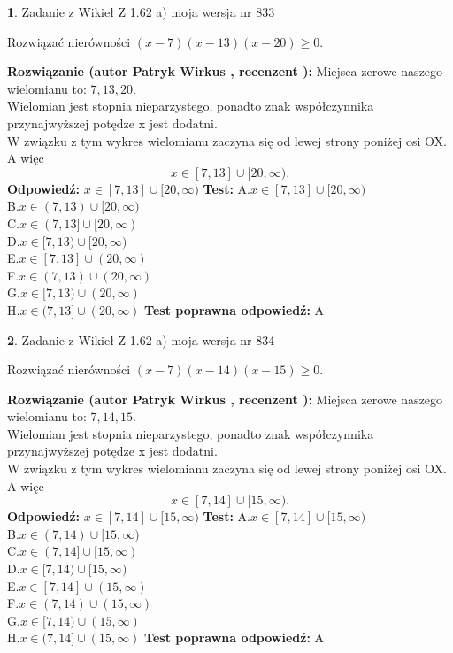 \documentclass[12pt, a4paper]{article}
\theoremstyle{definition} %
\newtheorem{zad}{}
\newcommand{\zadStart}[1]{\begin{zad}#1\newline}
\newcommand{\zadStop}{\end{zad}}
\newcommand{\rozwStart}[2]{\noindent \textbf{Rozwiązanie (autor #1 , recenzent #2): }\newline}
\newcommand{\rozwStop}{\newline}
\newcommand{\odpStart}{\noindent \textbf{Odpowiedź:}\newline}
\newcommand{\odpStop}{\newline}
\newcommand{\testStart}{\noindent \textbf{Test:}\newline}
\newcommand{\testStop}{\newline}
\newcommand{\kluczStart}{\noindent \textbf{Test poprawna odpowiedź:}\newline}
\newcommand{\kluczStop}{\newline}
\begin{document}
\zadStart{Zadanie z Wikieł Z 1.62 a) moja wersja nr 833}

Rozwiązać nierówności $(x-7)(x-13)(x-20)\ge0$.
\zadStop
\rozwStart{Patryk Wirkus}{}
Miejsca zerowe naszego wielomianu to: $7, 13, 20$.\\
Wielomian jest stopnia nieparzystego, ponadto znak współczynnika przy\linebreak najwyższej potędze x jest dodatni.\\ W związku z tym wykres wielomianu zaczyna się od lewej strony poniżej osi OX. A więc $$x \in [7,13] \cup [20,\infty).$$
\rozwStop
\odpStart
$x \in [7,13] \cup [20,\infty)$
\odpStop
\testStart
A.$x \in [7,13] \cup [20,\infty)$\\
B.$x \in (7,13) \cup [20,\infty)$\\
C.$x \in (7,13] \cup [20,\infty)$\\
D.$x \in [7,13) \cup [20,\infty)$\\
E.$x \in [7,13] \cup (20,\infty)$\\
F.$x \in (7,13) \cup (20,\infty)$\\
G.$x \in [7,13) \cup (20,\infty)$\\
H.$x \in (7,13] \cup (20,\infty)$
\testStop
\kluczStart
A
\kluczStop



\zadStart{Zadanie z Wikieł Z 1.62 a) moja wersja nr 834}

Rozwiązać nierówności $(x-7)(x-14)(x-15)\ge0$.
\zadStop
\rozwStart{Patryk Wirkus}{}
Miejsca zerowe naszego wielomianu to: $7, 14, 15$.\\
Wielomian jest stopnia nieparzystego, ponadto znak współczynnika przy\linebreak najwyższej potędze x jest dodatni.\\ W związku z tym wykres wielomianu zaczyna się od lewej strony poniżej osi OX. A więc $$x \in [7,14] \cup [15,\infty).$$
\rozwStop
\odpStart
$x \in [7,14] \cup [15,\infty)$
\odpStop
\testStart
A.$x \in [7,14] \cup [15,\infty)$\\
B.$x \in (7,14) \cup [15,\infty)$\\
C.$x \in (7,14] \cup [15,\infty)$\\
D.$x \in [7,14) \cup [15,\infty)$\\
E.$x \in [7,14] \cup (15,\infty)$\\
F.$x \in (7,14) \cup (15,\infty)$\\
G.$x \in [7,14) \cup (15,\infty)$\\
H.$x \in (7,14] \cup (15,\infty)$
\testStop
\kluczStart
A
\kluczStop
\end{document}
